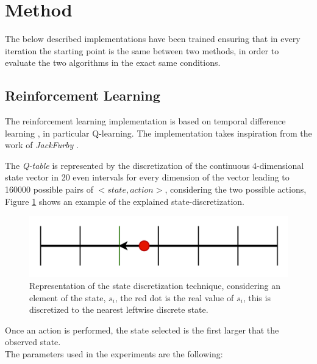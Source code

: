 \section{Method}
The below described implementations have been trained ensuring that in every iteration the starting point is the same between two methods, in order to evaluate the two algorithms in the exact same conditions.


\subsection{Reinforcement Learning}
The reinforcement learning implementation is based on temporal difference learning \cite{sutton1998temporal}, 
in particular Q-learning.
The implementation takes inspiration from the work of \textit{JackFurby} \cite{JackFurbyCartPole}.

The \textit{Q-table} is represented by the discretization of the continuous 4-dimensional state vector in 20 even intervals for every dimension of the vector leading to 160000 possible pairs of $<state,action>$, considering the two possible actions, Figure \ref{figDISC} shows an example of the explained state-discretization.

\begin{figure}[H]
	\centering
	\includegraphics [scale = 0.2]{Images/state_discretization.png}
	\caption{Representation of the state discretization technique, considering an element of the state, $s_i$, the red dot is the real value of $s_i$, this is discretized to the nearest leftwise discrete state.}
	\label{figDISC}
\end{figure}

Once an action is performed, the state selected is the first larger that the observed state.\\
The parameters used in the experiments are the following:



